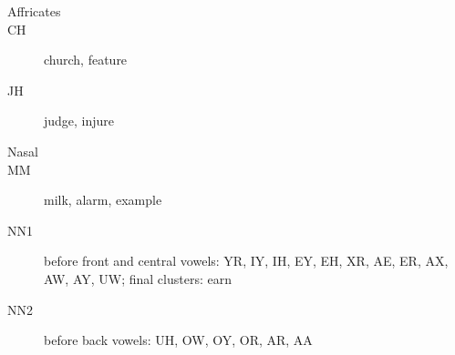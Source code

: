 \begin{description}
	\item[Affricates]
	\item[CH] church, feature
	\item[JH] judge, injure
\end{description}

\begin{description}
	\item[Nasal]
	\item[MM] milk, alarm, example
	\item[NN1] before front and central vowels: YR, IY, IH, EY, EH, XR, AE, ER, AX, AW, AY, UW; final clusters: earn
	\item[NN2] before back vowels: UH, OW, OY, OR, AR, AA
\end{description}



